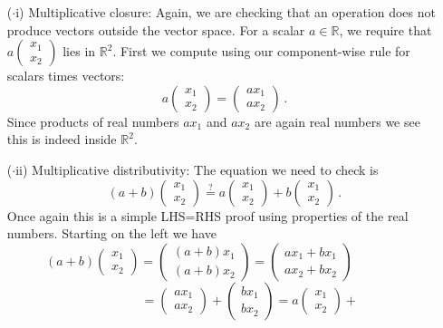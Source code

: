 {\begin{enumerate}
\item[($\cdot$i)] Multiplicative closure: Again, we are checking that 
an operation does not produce vectors outside the vector space. For a scalar $a\in{\mathbb R}$, we require that $a
\begin{pmatrix}x_1\\x_2\end{pmatrix}$ lies in ${\mathbb R}^2$.
First we compute using our component-wise rule for scalars times vectors:
$$
a
\begin{pmatrix}x_1\\x_2\end{pmatrix}=
\begin{pmatrix}ax_1\\ax_2\end{pmatrix}\, .
$$
Since products of real numbers $a x_1$ and $a x_2$ are again real numbers we see this is indeed inside ${\mathbb R}^2$.
\item[($\cdot$ii)] Multiplicative distributivity: The equation we need to check is
$$
(a+b)
\begin{pmatrix}x_1\\x_2\end{pmatrix}\stackrel?=
a\begin{pmatrix}x_1\\x_2\end{pmatrix}+
b\begin{pmatrix}x_1\\x_2\end{pmatrix}
\, .
$$ 
Once again this is a simple LHS=RHS proof using properties of the real numbers. Starting on the left we have
$$
(a+b)
\begin{pmatrix}x_1\\x_2\end{pmatrix}
=
\begin{pmatrix}(a+b)x_1\\(a+b)x_2\end{pmatrix}
=
\begin{pmatrix}ax_1+b x_1\\ax_2+bx_2\end{pmatrix}
\qquad\qquad$$ $$\qquad\qquad=
\begin{pmatrix}ax_1\\ax_2\end{pmatrix}+
\begin{pmatrix}b x_1\\bx_2\end{pmatrix}
=
a\begin{pmatrix}x_1\\x_2\end{pmatrix}+
$$
\end{enumerate}}
